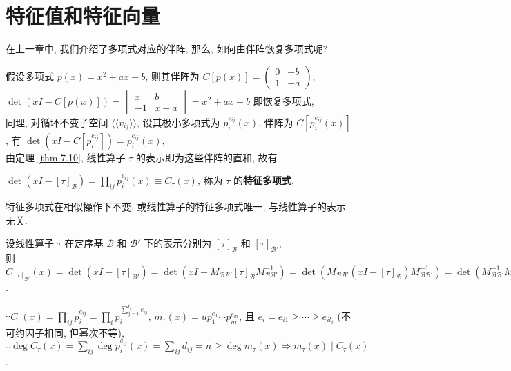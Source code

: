 \documentclass{note}
\begin{document}
\fi
\chapter{特征值和特征向量}
在上一章中, 我们介绍了多项式对应的伴阵, 那么, 如何由伴阵恢复多项式呢?

假设多项式 $p(x)=x^2+ax+b$, 则其伴阵为 $C[p(x)]=\begin{pmatrix}
    0&-b\\
    1&-a
\end{pmatrix}$,\\
$\det(xI-C[p(x)])=\begin{vmatrix}
    x&b\\
    -1&x+a
\end{vmatrix}=x^2+ax+b$ 即恢复多项式,\\
同理, 对循环不变子空间 $\langle\langle v_{ij}\rangle\rangle$, 设其极小多项式为 $p_i^{e_{ij}}(x)$, 伴阵为 $C[p_i^{e_{ij}}(x)]$, 有 $\det(xI-C[p_i^{e_{ij}}])=p_i^{e_{ij}}(x)$,\\
由定理 \ref{thm-7.10}, 线性算子 $\tau$ 的表示即为这些伴阵的直和, 故有
\begin{df}[特征多项式]
    $\det(xI-[\tau]_{\mathcal{B}})=\prod_{ij}p_i^{e_{ij}}(x)\equiv C_{\tau}(x)$, 称为 $\tau$ 的\textbf{特征多项式}.
\end{df}

\begin{thm}[(课本第 3 版 引理 7.17, 定理 7.18)]
    特征多项式在相似操作下不变, 或线性算子的特征多项式唯一, 与线性算子的表示无关.
\end{thm}
\begin{pf}
    设线性算子 $\tau$ 在定序基 $\mathcal{B}$ 和 $\mathcal{B}'$ 下的表示分别为 $[\tau]_{\mathcal{B}}$ 和 $[\tau]_{\mathcal{B}'}$,\\
    则 $C_{[\tau]_{\mathcal{B}'}}(x)=\det(xI-[\tau]_{\mathcal{B}'})=\det(xI-M_{\mathcal{BB}'}[\tau]_{\mathcal{B}}M_{\mathcal{BB}'}^{-1})=\det(M_{\mathcal{BB}'}(xI-[\tau]_{\mathcal{B}})M_{\mathcal{BB}'}^{-1})=\det(M_{\mathcal{BB}'}^{-1}M_{\mathcal{BB}'}(xI-[\tau]_{\mathcal{B}}))=\det(xI-[\tau]_{\mathcal{B}})=C_{[\tau]_{\mathcal{B}}}(x)$.
\end{pf}

$\because C_{\tau}(x)=\prod_{ij}p_i^{e_{ij}}=\prod_ip_i^{\sum_{j=1}^{t_i}e_{ij}}$, $m_{\tau}(x)=up_1^{e_1}\cdots p_m^{e_m}$, 且 $e_i=e_{i1}\geq\cdots\geq e_{it_i}$ (不可约因子相同, 但幂次不等), $\therefore\deg C_{\tau}(x)=\sum_{ij}\deg p_i^{e_{ij}}(x)=\sum_{ij}d_{ij}=n\geq\deg m_{\tau}(x)\Longrightarrow m_{\tau}(x)\mid C_{\tau}(x)$.
\end{document}
